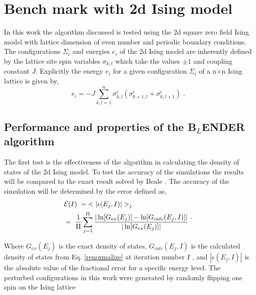 \documentclass[aps,pre,reprint,superscriptaddress,showkeys]{revtex4-1}
\begin{document}
 

\section{Bench mark with 2d Ising model}
\label{sec2}

In this work the algorithm discussed is tested using the 2d square zero field  Ising model with lattice dimension of even number\cite{exact_statistical,Onsager,Ising} and periodic boundary conditions. The configurations $\Sigma_i$ and energies $e_i$ of the 2d Ising model are inherently defined by the lattice site spin variables $\sigma_{k,l}$ which take the values $\pm 1$ and coupling constant $J$. Explicitly the energy $e_i$ for a given configuration $\Sigma_i$ of a n$\times$n Ising lattice is given by, 
\begin{equation}
e_i = -J\sum_{k,l=1}^{n}\sigma_{k,l}^{i}(\sigma_{k+1,l}^{i} + \sigma_{k,l+1}^{i})\;.
\end{equation}

\subsection{Performance and properties of the B$_L$ENDER algorithm}
  The first test is the effectiveness of the algorithm in calculating the density of states of the 2d Ising model.  To test the accuracy of the simulations the results will be compared to the exact result solved by Beale \cite{Beale_2d_ising}. The accuracy of the simulation will be determined by the error defined as, 
\begin{equation}
\begin{split}
 &\mathcal{E}(I) \hspace{0.1cm}= \hspace{0.1cm}< |\epsilon(E_j,I)| >_j\\
& = \hspace{0.1cm}  \frac{1}{\Pi} \sum_{j=1}^{\Pi}\frac{|\ln[G_{ex}(E_j)]- \ln[G_{calc}(E_j,I)]|}{|\ln[G_{ex}(E_j)]|}\; 
 \end{split}. 
 \label{avg_error}
\end{equation}

Where $G_{ex}(E_j)$ is the exact density of states, $G_{calc}(E_j,I)$ is the calculated density of states from Eq. \ref{renormalize}  at iteration number $I$ , and $|\epsilon(E_j,I)|$ is the absolute value of the fractional error for a specific energy level.  The perturbed configurations in this work were generated by randomly flipping one spin on the Ising lattice
\end{document}

